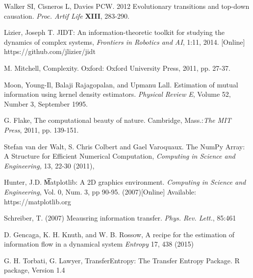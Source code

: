 \documentclass[conference]{IEEEtran}
\begin{document}

%
%
%
\begin{thebibliography}{1}
  
 Walker SI, Cisneros L, Davies PCW. 2012 Evolutionary transitions and top-down causation. {\it Proc. Artif Life} {\bf XIII}, 283-290.

  Lizier, Joseph T. 
  JIDT: An information-theoretic toolkit for studying the dynamics of complex systems, {\it Frontiers in Robotics and AI}, 1:11, 2014. [Online]  
  https://github.com/jlizier/jidt

 M. Mitchell, Complexity. Oxford: Oxford University Press, 2011, pp. 27-37.

Moon, Young-Il, Balaji Rajagopalan, and Upmanu Lall.  Estimation of mutual information using kernel density estimators.  {\it Physical Review E}, Volume 52, Number 3, September 1995.  

 G. Flake, The computational beauty of nature. Cambridge, Mass.:{\it  The MIT Press}, 2011, pp. 139-151.

 Stefan van der Walt, S. Chris Colbert and Gael Varoquaux. The NumPy Array: A Structure for Efficient Numerical Computation, {\it Computing in Science and Engineering,} 13, 22-30 (2011),

 Hunter, J.D. {\t Matplotlib: A 2D graphics environment}.  {\it Computing in Science and Engineering}, Vol. 0, Num. 3, pp 90-95.  (2007)[Online]
Available: https://matplotlib.org

 Schreiber, T. (2007) Meausring information transfer. {\it Phys. Rev. Lett.}, 85:461

 D. Gencaga, K. H. Knuth, and W. B. Rossow, A recipe for the estimation of information flow in a dynamical system {\it Entropy} 17, 438 (2015)

 G. H. Torbati, G. Lawyer, TransferEntropy: The Transfer Entropy Package. R package, Version 1.4


\end{thebibliography}




\end{document}
